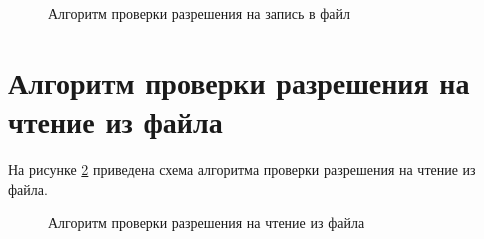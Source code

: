 \begin{figure}[ph!]
	\caption{Алгоритм проверки разрешения на запись в файл}
	\label{fig:write}
\end{figure}

\section{Алгоритм проверки разрешения на чтение из файла}

На рисунке \ref{fig:read} приведена схема алгоритма проверки разрешения на чтение из файла.

\begin{figure}[ph!]
	\caption{Алгоритм проверки разрешения на чтение из файла}
	\label{fig:read}
\end{figure}

